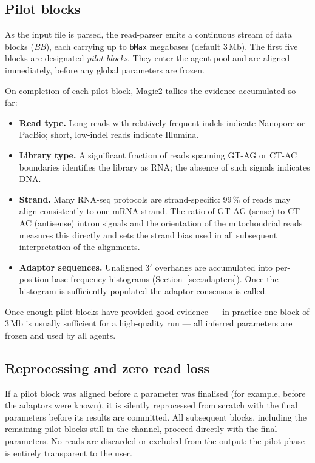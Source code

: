 \documentclass[11pt]{article}
\begin{document}
\subsection{Pilot blocks}
\label{sec:pilot_blocks}

As the input file is parsed, the read-parser emits a continuous
stream of data blocks (\emph{BB}), each carrying up to \texttt{bMax}
megabases (default 3\,Mb).
The first five blocks are designated \emph{pilot blocks}.
They enter the agent pool and are aligned immediately, before any
global parameters are frozen.

On completion of each pilot block, Magic2 tallies the evidence
accumulated so far:
\begin{itemize}
  \item \textbf{Read type.} Long reads with relatively frequent indels indicate
        Nanopore or PacBio; short, low-indel reads indicate Illumina.
  \item \textbf{Library type.} A significant fraction of reads
        spanning GT-AG or CT-AC boundaries identifies the library as
        RNA; the absence of such signals indicates DNA.
  \item \textbf{Strand.}
        Many RNA-seq protocols are strand-specific: 99\,\% of reads
        may align consistently to one mRNA strand.
        The ratio of GT-AG (sense) to CT-AC (antisense) intron signals
        and the orientation of the mitochondrial reads
        measures this directly and sets the strand bias used in all
        subsequent interpretation of the alignments.
  \item \textbf{Adaptor sequences.}
        Unaligned 3$'$ overhangs are accumulated into per-position
        base-frequency histograms (Section~\ref{sec:adapters}).
        Once the histogram is sufficiently populated the adaptor
        consensus is called.
\end{itemize}

Once enough pilot blocks have provided good evidence --- in
practice one block of 3\,Mb is usually sufficient for a high-quality
run --- all inferred parameters are frozen and used by all agents.

\subsection{Reprocessing and zero read loss}
\label{sec:pilot_reprocess}

If a pilot block was aligned before a parameter was finalised (for
example, before the adaptors were known), it is silently reprocessed
from scratch with the final parameters before its results are
committed.
All subsequent blocks, including the remaining pilot blocks still
in the channel, proceed directly with the final parameters.
No reads are discarded or excluded from the output: the pilot phase
is entirely transparent to the user.
\end{document}
